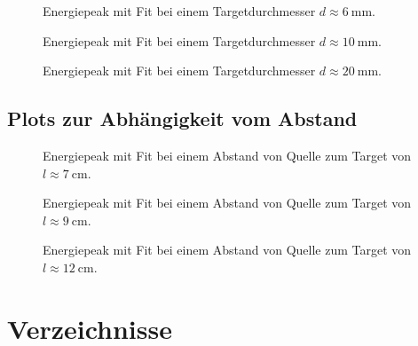 \documentclass[slug=CS, room=Andreas-Schubert-Bau\,\ Labor\ 406,
supervisor=Juliane\ Volkmer, coursedate=29.\ 11.\ 2019]{../../Lab_Report_LaTeX/lab_report}
\begin{document}
\begin{figure}[H]\centering
  
  \caption{Energiepeak mit Fit bei einem Targetdurchmesser \(d \approx \SI{6}{\milli\metre}\).}
  \label{fig:dicke-6}
\end{figure}

\begin{figure}[H]\centering
  
  \caption{Energiepeak mit Fit bei einem Targetdurchmesser \(d \approx \SI{10}{\milli\metre}\).}
  \label{fig:dicke-10}
\end{figure}

\begin{figure}[H]\centering
  
  \caption{Energiepeak mit Fit bei einem Targetdurchmesser \(d \approx \SI{20}{\milli\metre}\).}
  \label{fig:dicke-20}
\end{figure}

\subsection{Plots zur Abh\"angigkeit vom Abstand}
\label{sec:anabplot}

\begin{figure}[H]\centering
  
  \caption{Energiepeak mit Fit bei einem Abstand von Quelle zum Target von \(l \approx \SI{7}{\centi\metre}\).}
  \label{fig:dists-7}
\end{figure}

\begin{figure}[H]\centering
  
  \caption{Energiepeak mit Fit bei einem Abstand von Quelle zum Target von \(l \approx \SI{9}{\centi\metre}\).}
  \label{fig:dists-9}
\end{figure}

\begin{figure}[H]\centering
  
  \caption{Energiepeak mit Fit bei einem Abstand von Quelle zum Target von \(l \approx \SI{12}{\centi\metre}\).}
  \label{fig:dists-12}
\end{figure}

\section{Verzeichnisse}

\label{sec:literatur}

\listoffigures

\listoftables

\printbibliography
\end{document}
